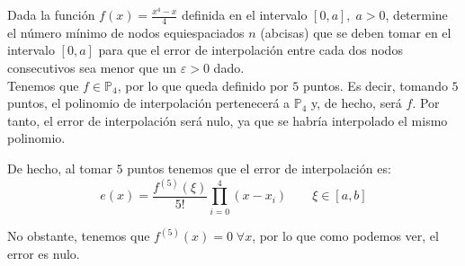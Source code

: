 \documentclass[12pt]{article}
\begin{document}
\begin{ejercicio}
    Dada la función $f(x) = \frac{x^4-x}{4}$ definida en el intervalo $[0,a],\;a>0$, determine el número mínimo de nodos equiespaciados $n$ (abcisas) que se deben tomar en el intervalo $[0,a]$ para que el error de interpolación entre cada dos nodos consecutivos sea menor que un $\varepsilon>0$ dado.\\

    Tenemos que $f\in \mathbb{P}_4$, por lo que queda definido por $5$ puntos. Es decir, tomando $5$ puntos, el polinomio de interpolación pertenecerá a $\mathbb{P}_4$ y, de hecho, será $f$. Por tanto, el error de interpolación será nulo, ya que se habría interpolado el mismo polinomio.

    De hecho, al tomar $5$ puntos tenemos que el error de interpolación es:
    \begin{equation*}
        e(x) = \frac{f^{(5)}(\xi)}{5!}\prod_{i=0}^4 (x-x_i) \qquad \xi \in [a,b]
    \end{equation*}

    No obstante, tenemos que $f^{(5)}(x)=0 \;\forall x$, por lo que como podemos ver, el error es nulo.
\end{ejercicio}
\end{document}
